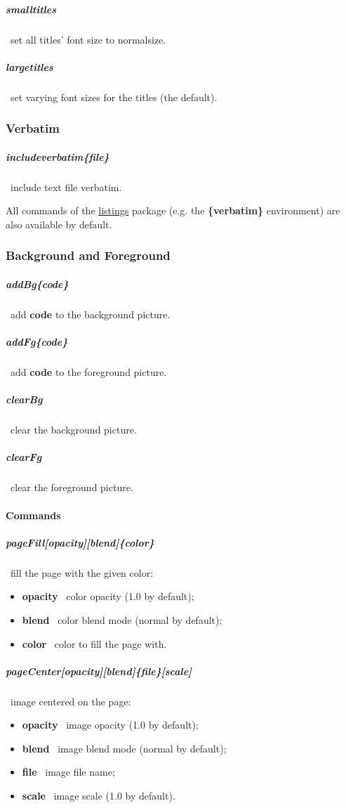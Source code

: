 \documentclass[english,12pt,openany,letterpaper]{book}
\begin{document}
\subparagraph{\bs smalltitles} \dash\ set all titles' font size to \bs normalsize.

\subparagraph{\bs largetitles} \dash\ set varying font sizes for the titles (the default).

\skipline

\subsubsection{Verbatim}

\subparagraph{\bs includeverbatim\{file\}} \dash\ include text file verbatim.

\skipline

All commands of the \href{https://www.ctan.org/pkg/listings}{listings} package (e.g. the \textbf{\{verbatim\}} environment) are also available by default.

\break

\subsubsection{Background and Foreground}

\subparagraph{\bs addBg\{code\}} \dash\ add \textbf{code} to the background picture.

\subparagraph{\bs addFg\{code\}} \dash\ add \textbf{code} to the foreground picture.

\subparagraph{\bs clearBg} \dash\ clear the background picture.

\subparagraph{\bs clearFg} \dash\ clear the foreground picture.

\skipline

\paragraph{Commands}

\subparagraph{\bs pageFill[opacity][blend]\{color\}} \dash\ fill the page with the given color:
\begin{itemize}
	\item \textbf{opacity} \dash\ color opacity (1.0 by default);
	\item \textbf{blend} \dash\ color blend mode (normal by default);
	\item \textbf{color} \dash\ color to fill the page with.
\end{itemize}

\subparagraph{\bs pageCenter[opacity][blend]\{file\}[scale]} \dash\ image centered on the page:
\begin{itemize}
	\item \textbf{opacity} \dash\ image opacity (1.0 by default);
	\item \textbf{blend} \dash\ image blend mode (normal by default);
	\item \textbf{file} \dash\ image file name;
	\item \textbf{scale} \dash\ image scale (1.0 by default).
\end{itemize}
\end{document}
